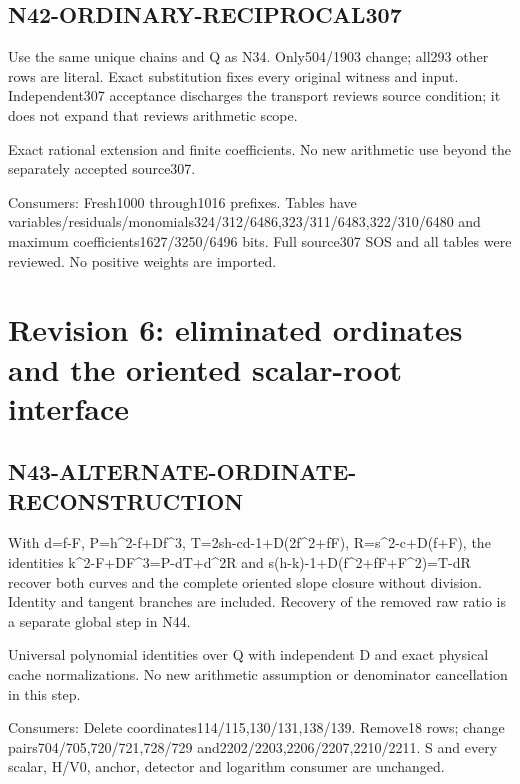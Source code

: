 \documentclass{article}
\begin{document}
\subsection{N42-ORDINARY-RECIPROCAL307}
\label{outline:r5-n42-ordinary-reciprocal307}
Use the same unique chains and Q as N34. Only504/1903 change; all293 other rows are literal. Exact substitution fixes every original witness and input. Independent307 acceptance discharges the transport reviews source condition; it does not expand that reviews arithmetic scope.
\par Exact rational extension and finite coefficients. No new arithmetic use beyond the separately accepted source307.
\par Consumers: Fresh1000 through1016 prefixes. Tables have variables/residuals/monomials324/312/6486,323/311/6483,322/310/6480 and maximum coefficients1627/3250/6496 bits. Full source307 SOS and all tables were reviewed. No positive weights are imported.
\section{Revision 6: eliminated ordinates and the oriented scalar-root interface}
\subsection{N43-ALTERNATE-ORDINATE-RECONSTRUCTION}
\label{outline:r6-n43-alternate-ordinate-reconstruction}
With d=f-F, P=h\textasciicircum{}2-f+Df\textasciicircum{}3, T=2sh-cd-1+D(2f\textasciicircum{}2+fF), R=s\textasciicircum{}2-c+D(f+F), the identities k\textasciicircum{}2-F+DF\textasciicircum{}3=P-dT+d\textasciicircum{}2R and s(h-k)-1+D(f\textasciicircum{}2+fF+F\textasciicircum{}2)=T-dR recover both curves and the complete oriented slope closure without division. Identity and tangent branches are included. Recovery of the removed raw ratio is a separate global step in N44.
\par Universal polynomial identities over Q with independent D and exact physical cache normalizations. No new arithmetic assumption or denominator cancellation in this step.
\par Consumers: Delete coordinates114/115,130/131,138/139. Remove18 rows; change pairs704/705,720/721,728/729 and2202/2203,2206/2207,2210/2211. S and every scalar, H/V0, anchor, detector and logarithm consumer are unchanged.
\end{document}
